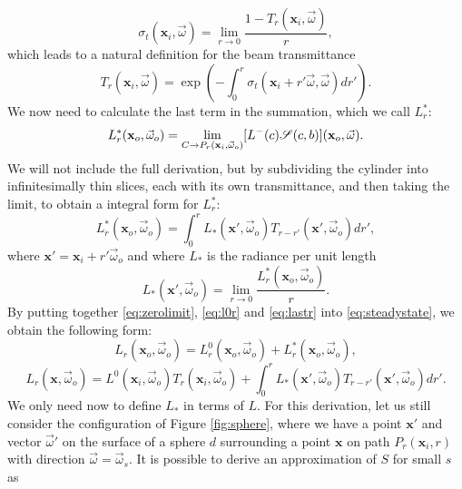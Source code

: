 \begin{equation*}
\sigma_t(\mathbf{x}_i, \vec{\omega}) = \lim_{r\rightarrow 0} \frac{1 - T_r(\mathbf{x}_i, \vec{\omega})}{r},
\end{equation*}
which leads to a natural definition for the beam transmittance
\begin{equation*}
T_r(\mathbf{x}_i, \vec{\omega}) = \exp\left(-\int_0^r \sigma_t(\mathbf{x}_i + r' \vec{\omega}, \vec{\omega}) dr'\right).
\end{equation*}
We now need to calculate the last term in the summation, which we call $L_r^*$:
\begin{equation*}
L_r^*(\mathbf{x}_o, \vec{\omega}_o) = \lim_{C\rightarrow P_r(\mathbf{x}_i,\vec{\omega}_o)} [L^-(c)\mathscr{S}(c,b)] (\mathbf{x}_o, \vec{\omega}).
\end{equation*}
We will not include the full derivation, but by subdividing the cylinder into infinitesimally thin slices, each with its own transmittance, and then taking the limit, to obtain a integral form for $L_r^*$:
\begin{equation}
\label{eq:lastr}
L_r^*(\mathbf{x}_o, \vec{\omega}_o) = \int_0^r L_*(\mathbf{x}', \vec{\omega}_o) T_{r-r'}(\mathbf{x}', \vec{\omega}_o)  dr',
\end{equation}
where $\mathbf{x}' = \mathbf{x}_i + r' \vec{\omega}_o$ and where $L_*$ is the radiance per unit length
\begin{equation*}
L_*(\mathbf{x}', \vec{\omega}_o) = \lim_{r \rightarrow 0} \frac{L_r^*(\mathbf{x}_o, \vec{\omega}_o)}{r}.
\end{equation*}
By putting together \ref{eq:zerolimit}, \ref{eq:l0r} and \ref{eq:lastr} into \ref{eq:steadystate}, we obtain the following form:
\begin{equation*}
L_r(\mathbf{x}_o, \vec{\omega}_o) = L_r^0(\mathbf{x}_o, \vec{\omega}_o) + L_r^*(\mathbf{x}_o, \vec{\omega}_o),
\end{equation*}
\begin{equation*}
L_r(\mathbf{x}, \vec{\omega}_o) =  L^0(\mathbf{x}_i, \vec{\omega}_o) T_r(\mathbf{x}_i, \vec{\omega}_o) + \int_0^r L_*(\mathbf{x}', \vec{\omega}_o) T_{r-r'}(\mathbf{x}', \vec{\omega}_o)  dr'.
\end{equation*}
We only need now to define $L_*$ in terms of $L$. For this derivation, let us still consider the configuration of Figure \ref{fig:sphere}, where we have a point $\mathbf{x}'$ and vector $\vec{\omega}'$ on the surface of a sphere $d$ surrounding a point $\mathbf{x}$ on path $P_r(\mathbf{x}_i,r)$ with direction $\vec{\omega} = \vec{\omega}_s$. It is possible to derive an approximation of $S$ for small $s$ as
